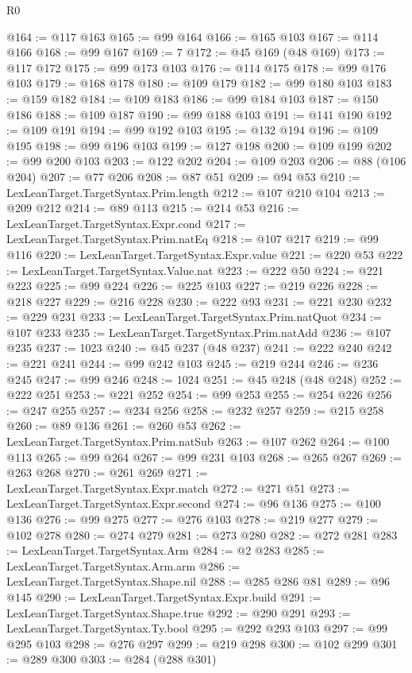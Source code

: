 \begin{lexlean}{R0}
\begin{coremodule}
@164 := @117 @163
@165 := @99 @164
@166 := @165 @103
@167 := @114 @166
@168 := @99 @167
@169 := 7
@172 := @45 @169 (@48 @169)
@173 := @117 @172
@175 := @99 @173 @103
@176 := @114 @175
@178 := @99 @176 @103
@179 := @168 @178
@180 := @109 @179
@182 := @99 @180 @103
@183 := @159 @182
@184 := @109 @183
@186 := @99 @184 @103
@187 := @150 @186
@188 := @109 @187
@190 := @99 @188 @103
@191 := @141 @190
@192 := @109 @191
@194 := @99 @192 @103
@195 := @132 @194
@196 := @109 @195
@198 := @99 @196 @103
@199 := @127 @198
@200 := @109 @199
@202 := @99 @200 @103
@203 := @122 @202
@204 := @109 @203
@206 := @88 (@106 @204)
@207 := @77 @206
@208 := @87 @51
@209 := @94 @53
@210 := LexLeanTarget.TargetSyntax.Prim.length
@212 := @107 @210 @104
@213 := @209 @212
@214 := @89 @113
@215 := @214 @53
@216 := LexLeanTarget.TargetSyntax.Expr.cond
@217 := LexLeanTarget.TargetSyntax.Prim.natEq
@218 := @107 @217
@219 := @99 @116
@220 := LexLeanTarget.TargetSyntax.Expr.value
@221 := @220 @53
@222 := LexLeanTarget.TargetSyntax.Value.nat
@223 := @222 @50
@224 := @221 @223
@225 := @99 @224
@226 := @225 @103
@227 := @219 @226
@228 := @218 @227
@229 := @216 @228
@230 := @222 @93
@231 := @221 @230
@232 := @229 @231
@233 := LexLeanTarget.TargetSyntax.Prim.natQuot
@234 := @107 @233
@235 := LexLeanTarget.TargetSyntax.Prim.natAdd
@236 := @107 @235
@237 := 1023
@240 := @45 @237 (@48 @237)
@241 := @222 @240
@242 := @221 @241
@244 := @99 @242 @103
@245 := @219 @244
@246 := @236 @245
@247 := @99 @246
@248 := 1024
@251 := @45 @248 (@48 @248)
@252 := @222 @251
@253 := @221 @252
@254 := @99 @253
@255 := @254 @226
@256 := @247 @255
@257 := @234 @256
@258 := @232 @257
@259 := @215 @258
@260 := @89 @136
@261 := @260 @53
@262 := LexLeanTarget.TargetSyntax.Prim.natSub
@263 := @107 @262
@264 := @100 @113
@265 := @99 @264
@267 := @99 @231 @103
@268 := @265 @267
@269 := @263 @268
@270 := @261 @269
@271 := LexLeanTarget.TargetSyntax.Expr.match
@272 := @271 @51
@273 := LexLeanTarget.TargetSyntax.Expr.second
@274 := @96 @136
@275 := @100 @136
@276 := @99 @275
@277 := @276 @103
@278 := @219 @277
@279 := @102 @278
@280 := @274 @279
@281 := @273 @280
@282 := @272 @281
@283 := LexLeanTarget.TargetSyntax.Arm
@284 := @2 @283
@285 := LexLeanTarget.TargetSyntax.Arm.arm
@286 := LexLeanTarget.TargetSyntax.Shape.nil
@288 := @285 @286 @81
@289 := @96 @145
@290 := LexLeanTarget.TargetSyntax.Expr.build
@291 := LexLeanTarget.TargetSyntax.Shape.true
@292 := @290 @291
@293 := LexLeanTarget.TargetSyntax.Ty.bool
@295 := @292 @293 @103
@297 := @99 @295 @103
@298 := @276 @297
@299 := @219 @298
@300 := @102 @299
@301 := @289 @300
@303 := @284 (@288 @301)

\end{coremodule}
\end{lexlean}
